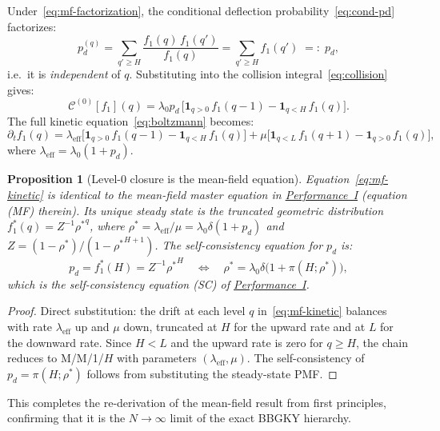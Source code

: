 \documentclass[11pt,a4paper]{report}
\newtheorem{proposition}[theorem]{Proposition}
\newcommand{\rhostar}{\rho^{*}}
\newcommand{\pd}{p_d}
\newcommand{\fone}{f_1}
\newcommand{\cC}{\mathcal{C}}
\begin{document}
Under~\eqref{eq:mf-factorization}, the conditional deflection
probability~\eqref{eq:cond-pd} factorizes:
\[
  \pd^{(q)} = \sum_{q' \geq H} \frac{\fone(q)\,\fone(q')}{\fone(q)}
  = \sum_{q' \geq H} \fone(q') \;=:\; \pd,
\]
i.e.\ it is \emph{independent} of $q$.  Substituting into the collision
integral~\eqref{eq:collision} gives:
\[
  \cC^{(0)}[\fone](q)
  = \lambda_0 \pd\,
    \bigl[\mathbf{1}_{q>0}\,\fone(q-1) - \mathbf{1}_{q < H}\,\fone(q)\bigr].
\]
The full kinetic equation~\eqref{eq:boltzmann} becomes:
\begin{equation}
  \partial_t \fone(q)
  = \lambda_{\mathrm{eff}}\bigl[\mathbf{1}_{q>0}\,\fone(q-1)
  - \mathbf{1}_{q<H}\,\fone(q)\bigr]
  + \mu\bigl[\mathbf{1}_{q<L}\,\fone(q+1) - \mathbf{1}_{q>0}\,\fone(q)\bigr],
  \label{eq:mf-kinetic}
\end{equation}
where $\lambda_{\mathrm{eff}} = \lambda_0(1 + \pd)$.

\begin{proposition}[Level-0 closure is the mean-field equation]
\label{prop:mf-recovery}
Equation~\eqref{eq:mf-kinetic} is identical to the mean-field master equation
in \hyperref[chap:load_balance]{Performance~I} (equation (MF) therein).
Its unique steady state is the truncated geometric distribution
$\fone^*(q) = Z^{-1} {\rhostar}^q$, where
$\rhostar = \lambda_{\mathrm{eff}} / \mu = \lambda_0 \delta (1 + \pd)$
and $Z = (1-\rhostar)/(1-{\rhostar}^{H+1})$.
The self-consistency equation for $\pd$ is:
\begin{equation}
  \pd = \fone^*(H) = Z^{-1} {\rhostar}^H
  \quad\Longleftrightarrow\quad
  \rhostar = \lambda_0 \delta\bigl(1 + \pi(H;\rhostar)\bigr),
  \label{eq:sc-mf}
\end{equation}
which is the self-consistency equation (SC) of \hyperref[chap:load_balance]{Performance~I}.
\end{proposition}

\begin{proof}
Direct substitution: the drift at each level $q$ in~\eqref{eq:mf-kinetic}
balances with rate $\lambda_{\mathrm{eff}}$ up and $\mu$ down, truncated at $H$
for the upward rate and at $L$ for the downward rate.
Since $H < L$ and the upward rate is zero for $q \geq H$, the chain
reduces to M/M/1/$H$ with parameters $(\lambda_{\mathrm{eff}}, \mu)$.
The self-consistency of $\pd = \pi(H; \rhostar)$ follows from substituting
the steady-state PMF.
\end{proof}

This completes the re-derivation of the mean-field result from first principles,
confirming that it is the $N \to \infty$ limit of the exact BBGKY hierarchy.
\end{document}
